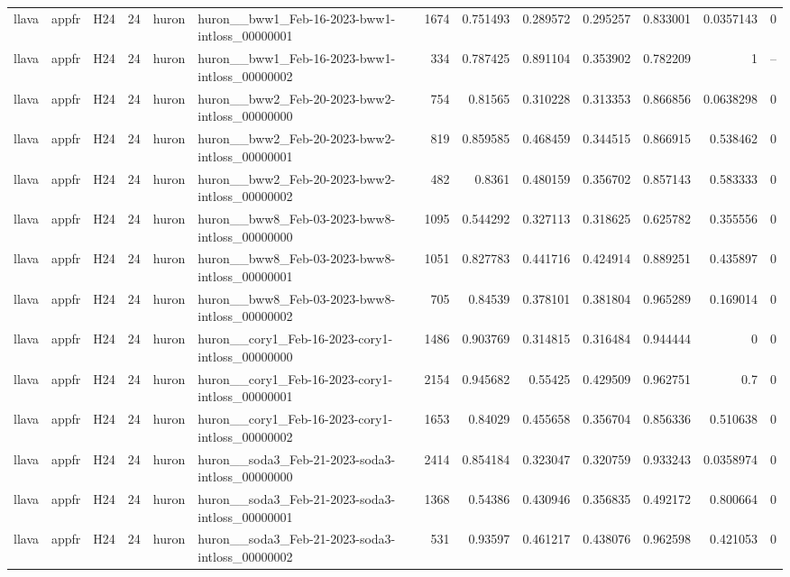 \begin{longtable}{lllrllrrrrrrr}
llava & appfr & H24 & 24 & huron & huron\_\_bww1\_Feb-16-2023-bww1-intloss\_00000001 & 1674 & 0.751493 & 0.289572 & 0.295257 & 0.833001 & 0.0357143 & 0 \\
llava & appfr & H24 & 24 & huron & huron\_\_bww1\_Feb-16-2023-bww1-intloss\_00000002 & 334 & 0.787425 & 0.891104 & 0.353902 & 0.782209 & 1 & -- \\
llava & appfr & H24 & 24 & huron & huron\_\_bww2\_Feb-20-2023-bww2-intloss\_00000000 & 754 & 0.81565 & 0.310228 & 0.313353 & 0.866856 & 0.0638298 & 0 \\
llava & appfr & H24 & 24 & huron & huron\_\_bww2\_Feb-20-2023-bww2-intloss\_00000001 & 819 & 0.859585 & 0.468459 & 0.344515 & 0.866915 & 0.538462 & 0 \\
llava & appfr & H24 & 24 & huron & huron\_\_bww2\_Feb-20-2023-bww2-intloss\_00000002 & 482 & 0.8361 & 0.480159 & 0.356702 & 0.857143 & 0.583333 & 0 \\
llava & appfr & H24 & 24 & huron & huron\_\_bww8\_Feb-03-2023-bww8-intloss\_00000000 & 1095 & 0.544292 & 0.327113 & 0.318625 & 0.625782 & 0.355556 & 0 \\
llava & appfr & H24 & 24 & huron & huron\_\_bww8\_Feb-03-2023-bww8-intloss\_00000001 & 1051 & 0.827783 & 0.441716 & 0.424914 & 0.889251 & 0.435897 & 0 \\
llava & appfr & H24 & 24 & huron & huron\_\_bww8\_Feb-03-2023-bww8-intloss\_00000002 & 705 & 0.84539 & 0.378101 & 0.381804 & 0.965289 & 0.169014 & 0 \\
llava & appfr & H24 & 24 & huron & huron\_\_cory1\_Feb-16-2023-cory1-intloss\_00000000 & 1486 & 0.903769 & 0.314815 & 0.316484 & 0.944444 & 0 & 0 \\
llava & appfr & H24 & 24 & huron & huron\_\_cory1\_Feb-16-2023-cory1-intloss\_00000001 & 2154 & 0.945682 & 0.55425 & 0.429509 & 0.962751 & 0.7 & 0 \\
llava & appfr & H24 & 24 & huron & huron\_\_cory1\_Feb-16-2023-cory1-intloss\_00000002 & 1653 & 0.84029 & 0.455658 & 0.356704 & 0.856336 & 0.510638 & 0 \\
llava & appfr & H24 & 24 & huron & huron\_\_soda3\_Feb-21-2023-soda3-intloss\_00000000 & 2414 & 0.854184 & 0.323047 & 0.320759 & 0.933243 & 0.0358974 & 0 \\
llava & appfr & H24 & 24 & huron & huron\_\_soda3\_Feb-21-2023-soda3-intloss\_00000001 & 1368 & 0.54386 & 0.430946 & 0.356835 & 0.492172 & 0.800664 & 0 \\
llava & appfr & H24 & 24 & huron & huron\_\_soda3\_Feb-21-2023-soda3-intloss\_00000002 & 531 & 0.93597 & 0.461217 & 0.438076 & 0.962598 & 0.421053 & 0 \\

\end{longtable}

